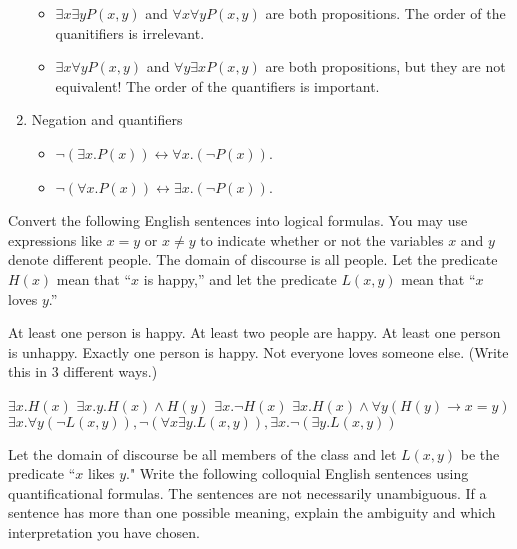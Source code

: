 \documentclass[solution, letterpaper]{cs20inclass}
\begin{document}
\begin{enumerate}
\begin{itemize}
\item $\exists x \exists y P(x,y)$ and $\forall x \forall y P(x,y)$ are both propositions. The order of the quanitifiers is irrelevant.

\item $\exists x \forall y P(x,y)$ and $\forall y \exists x P(x,y)$ are both propositions, but they are not equivalent! The order of the quantifiers is important. 

\end{itemize}

\item Negation and quantifiers
\begin{itemize}
\item $\neg (\exists x. P(x)) \leftrightarrow \forall x. (\neg P(x))$.
\item $\neg (\forall x. P(x)) \leftrightarrow \exists x. (\neg P(x))$.

\end{itemize}


\pagebreak
\end{enumerate}

\problem Convert the following English sentences into logical formulas. You may use expressions like $x=y$ or $x\neq y$ to indicate whether or not the variables $x$ and $y$ denote different people. The domain of discourse is all people. Let the predicate $H(x)$ mean that ``$x$ is happy,'' and let the predicate $L(x,y)$ mean that ``$x$ loves $y$.''

\subproblem At least one person is happy.
\subproblem At least two people are happy.
\subproblem At least one person is unhappy.
\subproblem Exactly one person is happy.
\subproblem Not everyone loves someone else. (Write this in 3 different ways.)

\begin{solution}
\subsolution $\exists x. H(x)$
\subsolution $\exists x.y.H(x) \wedge H(y)$
\subsolution $\exists x. \lnot H(x)$
\subsolution $\exists x. H(x) \wedge \forall y (H(y) \rightarrow x = y)$
\subsolution $\exists x. \forall y(\lnot L(x,y)), \lnot(\forall x \exists y. L(x,y)), \exists x . \lnot (\exists y . L(x,y))$

\end{solution}

\problem Let the domain of discourse be all members of the class and let $L(x,y)$ be the predicate ``$x$ likes $y$." Write the following colloquial English sentences using quantificational formulas. The sentences are not necessarily unambiguous. If a sentence has more than one possible meaning, explain the ambiguity and which interpretation you have chosen.
\end{document}
